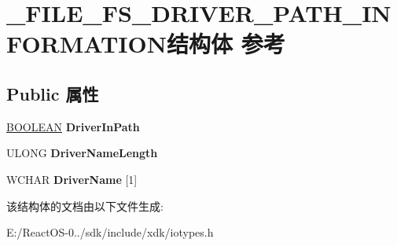 \hypertarget{struct___f_i_l_e___f_s___d_r_i_v_e_r___p_a_t_h___i_n_f_o_r_m_a_t_i_o_n}{}\section{\+\_\+\+F\+I\+L\+E\+\_\+\+F\+S\+\_\+\+D\+R\+I\+V\+E\+R\+\_\+\+P\+A\+T\+H\+\_\+\+I\+N\+F\+O\+R\+M\+A\+T\+I\+O\+N结构体 参考}
\label{struct___f_i_l_e___f_s___d_r_i_v_e_r___p_a_t_h___i_n_f_o_r_m_a_t_i_o_n}
\subsection*{Public 属性}
\begin{DoxyCompactItemize}
\item 
\mbox{\label{struct___f_i_l_e___f_s___d_r_i_v_e_r___p_a_t_h___i_n_f_o_r_m_a_t_i_o_n_a1ee75a8723cfd794fd56c8866cfc69f3}} 
\hyperlink{_processor_bind_8h_a112e3146cb38b6ee95e64d85842e380a}{B\+O\+O\+L\+E\+AN} {\bfseries Driver\+In\+Path}
\item 
\mbox{\label{struct___f_i_l_e___f_s___d_r_i_v_e_r___p_a_t_h___i_n_f_o_r_m_a_t_i_o_n_a5716e3ba25c33c54226a443936492371}} 
U\+L\+O\+NG {\bfseries Driver\+Name\+Length}
\item 
\mbox{\label{struct___f_i_l_e___f_s___d_r_i_v_e_r___p_a_t_h___i_n_f_o_r_m_a_t_i_o_n_af2ca801f272a41c45604fb64613a76ec}} 
W\+C\+H\+AR {\bfseries Driver\+Name} \mbox{[}1\mbox{]}
\end{DoxyCompactItemize}


该结构体的文档由以下文件生成\+:\begin{DoxyCompactItemize}
\item 
E\+:/\+React\+O\+S-\/0../sdk/include/xdk/iotypes.\+h\end{DoxyCompactItemize}
